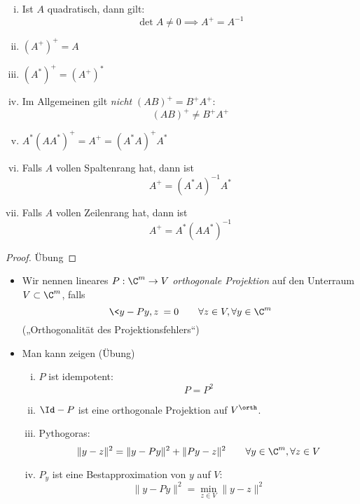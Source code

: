 \documentclass[11pt]{scrbook}
\begin{document}
\begin{st}[Eigenschaften]
	\label{1.41}
	\begin{enumerate}[i)]
		\item
			Ist $A$ quadratisch, dann gilt:
			\[
				\det A \neq 0 \implies A^+ = A^{-1}
			\]
		\item
			$(A^+)^+ = A$
		\item
			$(A^*)^+ = (A^+)^*$
		\item
			Im Allgemeinen gilt \emph{nicht} $(AB)^+ = B^+A^+$:
			\[
				(AB)^+ \neq B^+A^+
			\]
		\item
			$A^*(AA^*)^+ = A^+ = (A^*A)^+ A^*$
		\item
			Falls $A$ vollen Spaltenrang hat, dann ist
			\[
				A^+ = (A^*A)^{-1}A^*
			\]
		\item
			Falls $A$ vollen Zeilenrang hat, dann ist
			\[
				A^+ = A^*(AA^*)^{-1}
			\]
	\end{enumerate}
	\begin{proof}
		Übung
	\end{proof}
\end{st}

\begin{nt*}
	\begin{itemize}
		\item
			Wir nennen lineares $P: \C^m \to V$ \emph{orthogonale Projektion} auf den Unterraum $V\subset \C^m$, falls
			\[
				\<y- Py,z\> = 0 \qquad \forall z\in V, \forall y\in \C^m
			\]
			(„Orthogonalität des Projektionsfehlers“)
		\item
			Man kann zeigen (Übung)
			\begin{enumerate}[i)]
				\item
					$P$ ist idempotent:
					\[
						P = P^2
					\]
				\item
					$\Id - P$ ist eine orthogonale Projektion auf $V^\orth$.
				\item
					Pythogoras:
					\[
						\|y-z\|^2 = \|y-Py\|^2 + \|Py-z\|^2 
						\qquad \forall y\in \C^m,\forall z\in V
					\]
				\item
					$P_y$ ist eine Bestapproximation von $y$ auf $V$:
					\[
						\|y-Py\|^2 = \min_{z\in V}\|y-z\|^2
					\]
			\end{enumerate}
	\end{itemize}
\end{nt*}
\end{document}
